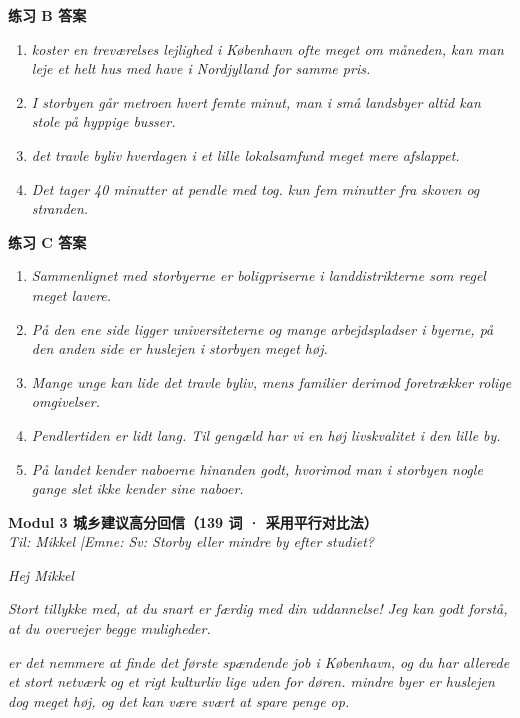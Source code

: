 \begin{answerbox}
\textbf{练习 B 答案}
\begin{enumerate}
  \item \textit{ koster en treværelses lejlighed i København ofte meget om måneden,  kan man leje et helt hus med have i Nordjylland for samme pris.}
  \item \textit{I storbyen går metroen hvert femte minut,  man i små landsbyer  altid kan stole på hyppige busser.}
  \item \textit{ det travle byliv  hverdagen i et lille lokalsamfund meget mere afslappet.}
  \item \textit{Det tager 40 minutter at pendle med tog.   kun fem minutter fra skoven og stranden.}
\end{enumerate}

\textbf{练习 C 答案}
\begin{enumerate}
  \item \textit{Sammenlignet med storbyerne er boligpriserne i landdistrikterne som regel meget lavere.}
  \item \textit{På den ene side ligger universiteterne og mange arbejdspladser i byerne, på den anden side er huslejen i storbyen meget høj.}
  \item \textit{Mange unge kan lide det travle byliv, mens familier derimod foretrækker rolige omgivelser.}
  \item \textit{Pendlertiden er lidt lang. Til gengæld har vi en høj livskvalitet i den lille by.}
  \item \textit{På landet kender naboerne hinanden godt, hvorimod man i storbyen nogle gange slet ikke kender sine naboer.}
\end{enumerate}

\textbf{Modul 3 城乡建议高分回信（139 词 · 采用平行对比法）}\\
\textit{Til: Mikkel \quad|\quad Emne: Sv: Storby eller mindre by efter studiet?}

\textit{Hej Mikkel}

\textit{Stort tillykke med, at du snart er færdig med din uddannelse! Jeg kan godt forstå, at du overvejer begge muligheder.}

\textit{ er det nemmere at finde det første spændende job i København, og du har allerede et stort netværk og et rigt kulturliv lige uden for døren.  mindre byer er huslejen dog meget høj, og det kan være svært at spare penge op.}


\end{answerbox}
